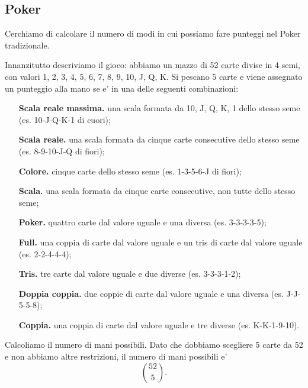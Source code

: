 \subsection{Poker}

Cerchiamo di calcolare il numero di modi in cui possiamo fare punteggi nel Poker tradizionale. 

Innanzitutto descriviamo il gioco: abbiamo un mazzo di 52 carte divise in 4 semi, con valori 1, 2, 3, 4, 5, 6, 7, 8, 9, 10, J, Q, K.
Si pescano 5 carte e viene assegnato un punteggio alla mano se e' in una delle seguenti combinazioni: \begin{itemize}
    \item[\textbf{Scala reale massima.}] una scala formata da 10, J, Q, K, 1 dello stesso seme (es. 10-J-Q-K-1 di cuori);
    \item[\textbf{Scala reale.}]  una scala formata da cinque carte consecutive dello stesso seme (es. 8-9-10-J-Q di fiori);
    \item[\textbf{Colore.}]  cinque carte dello stesso seme (es. 1-3-5-6-J di fiori);    
    \item[\textbf{Scala.}] una scala formata da cinque carte consecutive, non tutte dello stesso seme;
    \item[\textbf{Poker.}]  quattro carte dal valore uguale e una diversa (es. 3-3-3-3-5);
    \item[\textbf{Full.}] una coppia di carte dal valore uguale e un tris di carte dal valore uguale (es. 2-2-4-4-4);
    \item[\textbf{Tris.}] tre carte dal valore uguale e due diverse (es. 3-3-3-1-2);
    \item[\textbf{Doppia coppia.}] due coppie di carte dal valore uguale e una diversa (es. J-J-5-5-8);
    \item[\textbf{Coppia.}]una coppia di carte dal valore uguale e tre diverse (es. K-K-1-9-10).
\end{itemize}

Calcoliamo il numero di mani possibili. Dato che dobbiamo scegliere 5 carte da 52 e non abbiamo altre restrizioni, il numero di mani possibili e' \[\binom{52}{5}.\]

